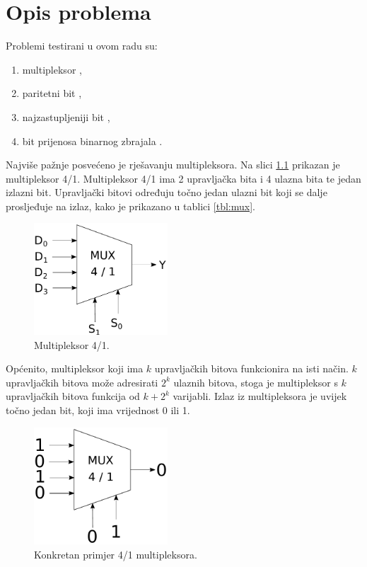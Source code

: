 \documentclass[times, utf8, zavrsni]{fer}
\begin{document}
\chapter{Opis problema} \label{ch:prob}
Problemi testirani u ovom radu su:
\begin{enumerate}
    \item multipleksor ,
    \item paritetni bit ,
    \item najzastupljeniji bit ,
    \item bit prijenosa binarnog zbrajala .
\end{enumerate}

Najviše pažnje posvećeno je rješavanju multipleksora.
Na slici \ref{img:mux} prikazan je multipleksor 4/1.
Multipleksor 4/1 ima 2 upravljačka bita i 4 ulazna bita te jedan izlazni bit.
Upravljački bitovi određuju točno jedan ulazni bit koji se dalje prosljeđuje na izlaz, kako je prikazano u tablici \ref{tbl:mux}.
\begin{figure}[h]
    \centering
    \includegraphics[width=5cm]{img/mux.pdf}
    \caption{Multipleksor 4/1.}
    \label{img:mux}
\end{figure}
Općenito, multipleksor koji ima $k$ upravljačkih bitova funkcionira na isti način.
$k$ upravljačkih bitova može adresirati $2^{k}$ ulaznih bitova, stoga je multipleksor s $k$ upravljačkih bitova funkcija od $k + 2^{k}$ varijabli.
Izlaz iz multipleksora je uvijek točno jedan bit, koji ima vrijednost 0 ili 1.
\begin{figure}[h]
    \centering
    \includegraphics[width=5cm]{img/muxex.pdf}
    \caption{Konkretan primjer 4/1 multipleksora.}
    \label{img:muxex}
\end{figure}
\end{document}
